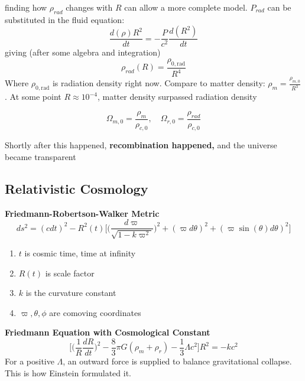 finding how $\rho_{rad}$ changes with $R$ can allow a more complete model. $P_{rad}$ can be substituted in the fluid equation:
\begin{equation}
	\label{}
	\frac{d(\rho)R^{2}}{dt}=-\frac{P}{c^{2}}\frac{d(R^{2})}{dt}
\end{equation}
giving (after some algebra and integration)
\begin{equation}
	\label{}
	\rho_{rad}(R)=\frac{\rho_{0,\mbox{rad}}}{R^{4}}	
\end{equation}
Where $\rho_{0,\mbox{rad}}$ is radiation density right now.
Compare to matter density: $\rho_{m}=\frac{\rho_{m,0}}{R^{3}}$. At some point $R\approx 10^{-4}$, matter density surpassed radiation density

\begin{equation}
	\label{}
	\Omega_{m,0}=\frac{\rho_{m}}{\rho_{c,0}},\quad \Omega_{r,0}=\frac{\rho_{rad}}{\rho_{c,0}}
\end{equation}

Shortly after this happened, \textbf{recombination happened, }and the universe became transparent


\subsection{Relativistic Cosmology}
\textbf{Friedmann-Robertson-Walker Metric}
\begin{equation}
	\label{}
	ds^{2}=(cdt)^{2}-R^{2}(t)\bigg[	\big(\frac{d\varpi}{\sqrt{1-k\varpi^{2}}}\big)^{2}+(\varpi d\theta)^{2}+(\varpi\sin(\theta)d\theta)^{2}	\bigg]
\end{equation}
\begin{enumerate}
	\item $t$ is cosmic time, time at infinity
	\item $R(t)$ is scale factor
	\item $k$ is the curvature constant
	\item $\varpi,\theta,\phi$ are comoving coordinates
\end{enumerate}

\textbf{Friedmann Equation with Cosmological Constant}
\begin{equation}
	\label{}
	\bigg[\big(\frac{1}{R}\frac{dR}{dt}\big)^{2}-\frac{8}{3}\pi G(\rho_{m}+\rho_{r})-\frac{1}{3}\Lambda c^{2}\bigg]R^{2}=-kc^{2}
\end{equation}
For a positive $\Lambda$, an outward force is supplied to balance gravitational collapse. This is how Einstein formulated it.

